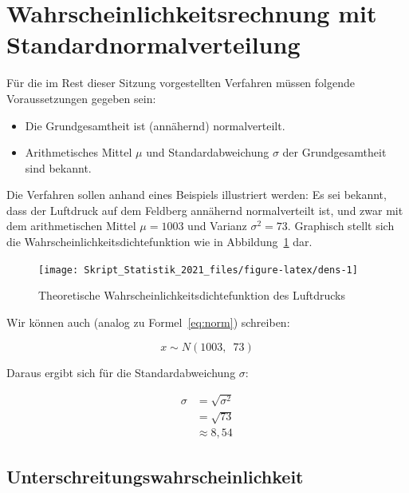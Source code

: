 \documentclass[
  11pt,
  ngerman,
  a4paper,
]{report}
\providecommand{\tightlist}{%
  \setlength{\itemsep}{0pt}\setlength{\parskip}{0pt}}
\begin{document}
\hypertarget{wahrscheinlichkeitsrechnung-mit-standardnormalverteilung}{%
\section{Wahrscheinlichkeitsrechnung mit Standardnormalverteilung}\label{wahrscheinlichkeitsrechnung-mit-standardnormalverteilung}}

Für die im Rest dieser Sitzung vorgestellten Verfahren müssen folgende Voraussetzungen gegeben sein:

\begin{itemize}
\tightlist
\item
  Die Grundgesamtheit ist (annähernd) normalverteilt.
\item
  Arithmetisches Mittel \(\mu\) und Standardabweichung \(\sigma\) der Grundgesamtheit sind bekannt.
\end{itemize}

Die Verfahren sollen anhand eines Beispiels illustriert werden: Es sei bekannt, dass der Luftdruck auf dem Feldberg annähernd normalverteilt ist, und zwar mit dem arithmetischen Mittel \(\mu=1003\) und Varianz \(\sigma^2=73\). Graphisch stellt sich die Wahrscheinlichkeitsdichtefunktion wie in Abbildung~\ref{fig:dens} dar.

\begin{figure}[t]

{\centering \texttt{[image: Skript\_Statistik\_2021\_files/figure-latex/dens-1]} 

}

\caption{Theoretische Wahrscheinlichkeitsdichtefunktion des Luftdrucks}\label{fig:dens}
\end{figure}

Wir können auch (analog zu Formel~\eqref{eq:norm}) schreiben:

\[
x \sim N(1003,\enspace73)
\]

Daraus ergibt sich für die Standardabweichung \(\sigma\):
\nopagebreak

\[\begin{aligned}
\sigma&=\sqrt{\sigma^2}\\
&=\sqrt{73}\\
&\approx8{,}54
\end{aligned}\]

\hypertarget{unter}{%
\subsection{Unterschreitungswahrscheinlichkeit}\label{unter}}
\end{document}
